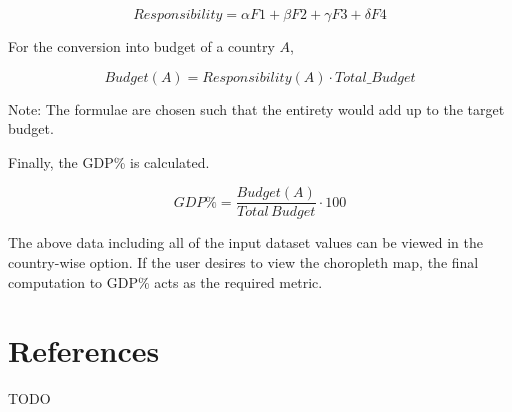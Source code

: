 \documentclass[fontsize=11pt]{article}
\begin{document}
\[
 Responsibility = \alpha F1 + \beta F2 + \gamma F3 + \delta F4
\]

For the conversion into budget of a country $A$,

\[
  Budget(A) = Responsibility(A) \cdot Total \_ Budget
\]

Note: The formulae are chosen such that the entirety would add up to the target budget.\newline

Finally, the  GDP\%  is calculated.

\[
  GDP \% = \frac{Budget(A)}{Total \, Budget} \cdot 100
\]

The above data including all of the input dataset values can be viewed in the country-wise option.
If the user desires to view the choropleth map, the final computation to GDP\% acts as the required metric.





\section*{References}

TODO

\end{document}
